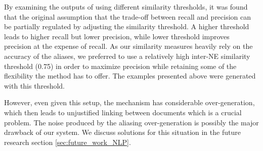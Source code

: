 By examining the outputs of using different similarity thresholds, it was found that the original assumption that the trade-off between recall and precision can be partially regulated by adjusting the similarity threshold. A higher threshold leads to higher recall but lower precision, while lower threshold improves precision at the expense of recall. As our similarity measures heavily rely on the accuracy of the aliases, we preferred to use a relatively high inter-NE similarity threshold (0.75) in order to maximize precision while retaining some of the flexibility the method has to offer. The examples presented above were generated with this threshold.

However, even given this setup, the mechanism has considerable over-generation, which then leads to unjustified linking between documents which is a crucial problem. The noise produced by the aliasing over-generation is possibly the major drawback of our system. We discuss solutions for this situation in the future research section \ref{sec:future_work_NLP}.


